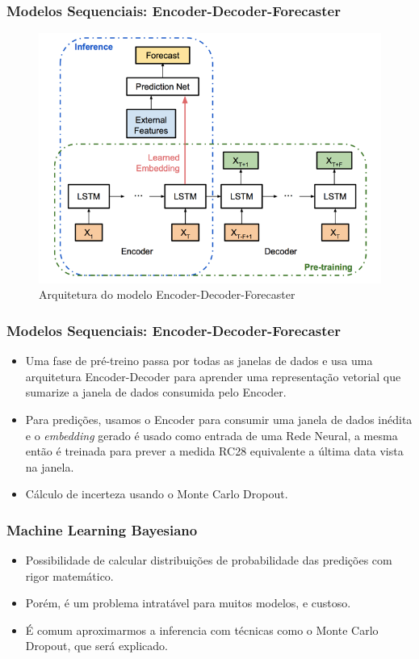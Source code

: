\documentclass{beamer}
\begin{document}
\begin{frame}
\frametitle{Modelos Sequenciais: Encoder-Decoder-Forecaster}
\begin{figure}[H]
\centering
\includegraphics[scale=0.4]{uber.png}
\caption{Arquitetura do modelo Encoder-Decoder-Forecaster}
\end{figure}
\end{frame}

\begin{frame}
\frametitle{Modelos Sequenciais: Encoder-Decoder-Forecaster}

\begin{itemize}
  \item Uma fase de pré-treino passa por todas as janelas de dados e usa uma
    arquitetura Encoder-Decoder para aprender uma representação vetorial que
    sumarize a janela de dados consumida pelo Encoder. 
  \item Para predições, usamos o Encoder para consumir uma janela de dados
    inédita e o \textit{embedding} gerado é usado como entrada de uma Rede Neural, a mesma então é
    treinada para prever a medida RC28 equivalente a última data vista na
    janela. 
 \item Cálculo de incerteza usando o Monte Carlo Dropout. 
  \end{itemize}

\end{frame}



\begin{frame}
  \frametitle{Machine Learning Bayesiano}
\begin{itemize}
  \item Possibilidade de calcular distribuições de probabilidade das predições
    com rigor matemático.
  \item Porém, é um problema intratável para muitos modelos, e custoso.
   \item É comum aproximarmos a inferencia com técnicas como o Monte Carlo
     Dropout, que será explicado.
  
  \end{itemize}

  
\end{frame}
\end{document}
